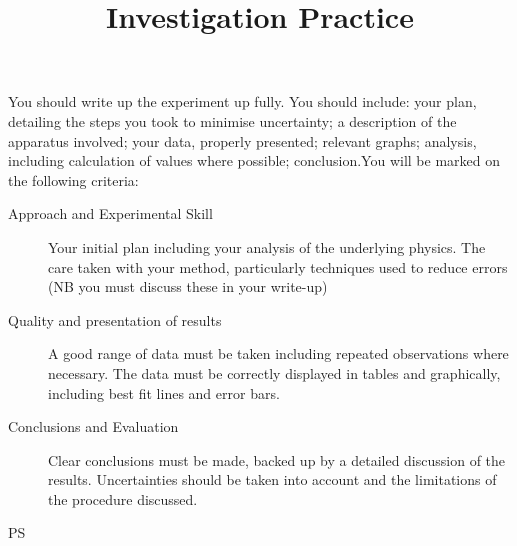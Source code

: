 \documentclass{article}
\title{Investigation Practice}
\begin{document}
\maketitle \thispagestyle{empty}

You should write up the experiment up fully.  You should include: your plan, detailing the steps you took to minimise uncertainty; a description of the apparatus involved; your data, properly presented; relevant graphs; analysis, including calculation of values where possible; conclusion.You will be marked on the following criteria:\begin{description}\item[Approach and Experimental Skill]  Your initial plan including your analysis of the underlying physics.  The care taken with your method, particularly techniques used to reduce errors (NB you must discuss these in your write-up)\item[Quality and presentation of results] A good range of data must be taken including repeated observations where necessary.  The data must be correctly displayed in tables and graphically, including best fit lines and error bars.\item[Conclusions and Evaluation] Clear conclusions must be made, backed up by a detailed discussion of the results.  Uncertainties should be taken into account and the limitations of the procedure discussed.\end{description}

PS
\end{document}

